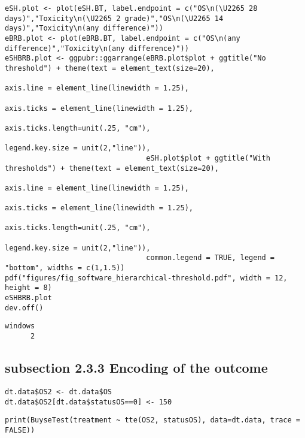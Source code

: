 \documentclass[12pt]{article}
\begin{document}
\lstset{language=r,label= ,caption= ,captionpos=b,numbers=none}
\begin{lstlisting}
eSH.plot <- plot(eSH.BT, label.endpoint = c("OS\n(\U2265 28 days)","Toxicity\n(\U2265 2 grade)","OS\n(\U2265 14 days)","Toxicity\n(any difference)"))
eBRB.plot <- plot(eBRB.BT, label.endpoint = c("OS\n(any difference)","Toxicity\n(any difference)")) 
eSHBRB.plot <- ggpubr::ggarrange(eBRB.plot$plot + ggtitle("No threshold") + theme(text = element_text(size=20), 
                                                                                  axis.line = element_line(linewidth = 1.25),
                                                                                  axis.ticks = element_line(linewidth = 1.25),
                                                                                  axis.ticks.length=unit(.25, "cm"),
                                                                                  legend.key.size = unit(2,"line")),
                                 eSH.plot$plot + ggtitle("With thresholds") + theme(text = element_text(size=20), 
                                                                                    axis.line = element_line(linewidth = 1.25),
                                                                                    axis.ticks = element_line(linewidth = 1.25),
                                                                                    axis.ticks.length=unit(.25, "cm"),
                                                                                    legend.key.size = unit(2,"line")),
                                 common.legend = TRUE, legend = "bottom", widths = c(1,1.5))
pdf("figures/fig_software_hierarchical-threshold.pdf", width = 12, height = 8)
eSHBRB.plot
dev.off()
\end{lstlisting}

\begin{verbatim}
windows 
      2
\end{verbatim}

\subsection{subsection 2.3.3 Encoding of the outcome}
\label{sec:org0dc0b46}
\lstset{language=r,label= ,caption= ,captionpos=b,numbers=none}
\begin{lstlisting}
dt.data$OS2 <- dt.data$OS
dt.data$OS2[dt.data$statusOS==0] <- 150
\end{lstlisting}

\lstset{language=r,label= ,caption= ,captionpos=b,numbers=none}
\begin{lstlisting}
print(BuyseTest(treatment ~ tte(OS2, statusOS), data=dt.data, trace = FALSE))
\end{lstlisting}
\end{document}
